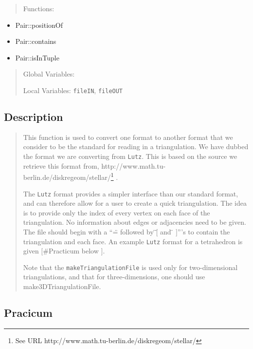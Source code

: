 \begin{quotation}
Functions:
\end{quotation}

\begin{itemize}
\item Pair::positionOf

\item Pair::contains

\item Pair::isInTuple
\end{itemize}

\begin{quotation}
Global Variables:

Local Variables: \texttt{fileIN}, \texttt{fileOUT}
\end{quotation}

\subsection*{Description}

\begin{quotation}
This function is used to convert one format to another format that we
consider to be the standard for reading in a triangulation. We have dubbed
the format we are converting from \texttt{Lutz}. This is based on the source
we retrieve this format from,
http://www.math.tu-berlin.de/diskregeom/stellar/\footnote{%
See URL http://www.math.tu-berlin.de/diskregeom/stellar/} .

The \texttt{Lutz} format provides a simpler interface than our standard
format, and can therefore allow for a user to create a quick triangulation.
The idea is to provide only the index of every vertex on each face of the
triangulation. No information about edges or adjacencies need to be given.
The file should begin with a ``=\"{} followed by \"{}\mbox{$[$}\"{} and \"{}%
\mbox{$]$}'''s to contain the triangulation and each face. An example 
\texttt{Lutz} format for a tetrahedron is given \mbox{$[$}\#Practicum below%
\mbox{$]$}.

Note that the \texttt{makeTriangulationFile} is used only for
two-dimensional triangulations, and that for three-dimensions, one should
use make3DTriangulationFile.
\end{quotation}

\subsection*{Pracicum}

